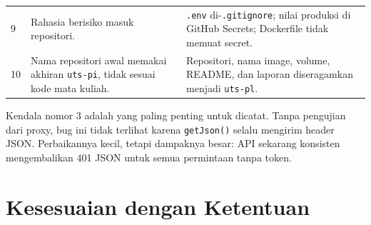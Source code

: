 \documentclass[12pt,a4paper,oneside]{book}
\begin{document}
\begin{table}[H]
\begin{tabularx}{\textwidth}{@{}p{0.8cm} X X@{}}
9 & Rahasia berisiko masuk repositori. & \texttt{.env} di-\texttt{.gitignore}; nilai produksi di GitHub Secrets; Dockerfile tidak memuat secret. \\
10 & Nama repositori awal memakai akhiran \texttt{uts-pi}, tidak sesuai kode mata kuliah. & Repositori, nama image, volume, README, dan laporan diseragamkan menjadi \texttt{uts-pl}. \\
\bottomrule
\end{tabularx}
\end{table}

Kendala nomor 3 adalah yang paling penting untuk dicatat. Tanpa pengujian dari
proxy, bug ini tidak terlihat karena \texttt{getJson()} selalu mengirim header
JSON. Perbaikannya kecil, tetapi dampaknya besar: API sekarang konsisten
mengembalikan 401 JSON untuk semua permintaan tanpa token.

\section{Kesesuaian dengan Ketentuan}
\end{document}
